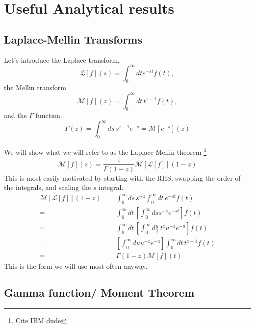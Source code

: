 \section{Useful Analytical results}

\subsection{ Laplace-Mellin Transforms}

Let's introduce the Laplace transform, 
\begin{equation}
\mathfrak{L}[f](s) = \int_0^\infty dt e^{-st} f(t),
\end{equation}
the Mellin transform
\begin{equation}
\mathcal{M}[f](z)= \int_0^\infty dt\, t^{z-1}f(t),
\end{equation}
and the $\Gamma$ function.  
\begin{equation}
\Gamma(z) = \int_0^\infty ds\, s^{z-1} e^{-s} = \mathcal{M}[e^{-s}](z)
\end{equation}

We will show what we will refer to as the Laplace-Mellin theorem \footnote{Cite IBM dude}
\begin{equation}
\mathcal{M}[f](z) = \frac{1}{\Gamma(1-z)}\mathcal{M}[\mathcal{L}[f]](1-z)\label{eq:Laplace-Mellin}
\end{equation}
This is most easily motivated by starting with the RHS, swapping the order of the integrals, and scaling the $s$ integral.  
\begin{align}
\mathcal{M}[\mathcal{L}[f]](1-z) =& 
\int_0^\infty ds\, s^{-z} \int_0^\infty dt\,e^{-st} f(t)\\ 
=& \int_0^\infty dt\,\left[\int_0^\infty ds s^{-z} e^{-st}\right] f(t)\\
=& \int_0^\infty dt\,\left[\int_0^\infty d\frac{u}{t}\, t^zu^{-z} e^{-u}\right] f(t) \\
=&\left[\int_0^\infty du u^{-z} e^{-u}\right]\int_0^\infty dt\,t^{z-1} f(t) \\
=& \Gamma(1-z)\mathcal{M}[f](t)
\end{align}
This is the form we will use most often anyway.  
\subsection{Gamma function/ Moment Theorem}

